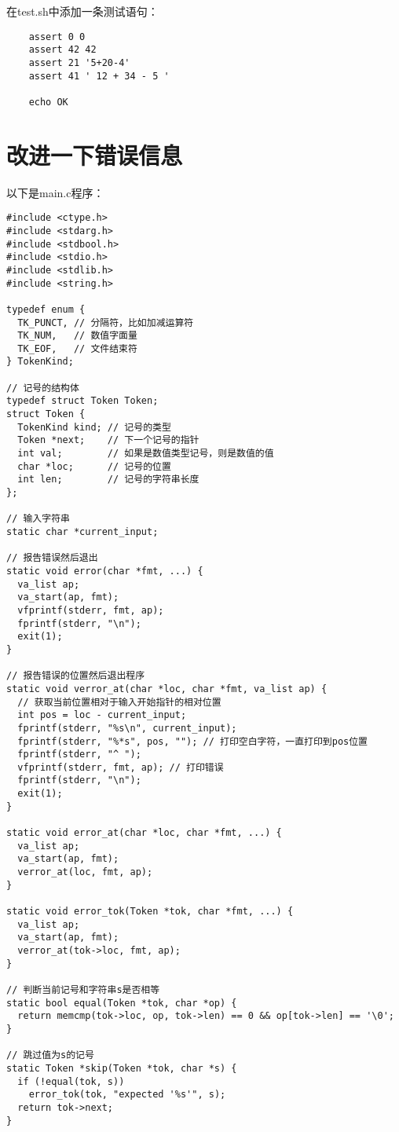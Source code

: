 \documentclass[cn,10pt,math=newtx,citestyle=gb7714-2015,bibstyle=gb7714-2015]{elegantbook}
\begin{document}
在test.sh中添加一条测试语句：

\begin{verbatim}
    assert 0 0
    assert 42 42
    assert 21 '5+20-4'
    assert 41 ' 12 + 34 - 5 '

    echo OK
\end{verbatim}

\chapter{改进一下错误信息}

以下是main.c程序：

\begin{verbatim}
#include <ctype.h>
#include <stdarg.h>
#include <stdbool.h>
#include <stdio.h>
#include <stdlib.h>
#include <string.h>

typedef enum {
  TK_PUNCT, // 分隔符，比如加减运算符
  TK_NUM,   // 数值字面量
  TK_EOF,   // 文件结束符
} TokenKind;

// 记号的结构体
typedef struct Token Token;
struct Token {
  TokenKind kind; // 记号的类型
  Token *next;    // 下一个记号的指针
  int val;        // 如果是数值类型记号，则是数值的值
  char *loc;      // 记号的位置
  int len;        // 记号的字符串长度
};

// 输入字符串
static char *current_input;

// 报告错误然后退出
static void error(char *fmt, ...) {
  va_list ap;
  va_start(ap, fmt);
  vfprintf(stderr, fmt, ap);
  fprintf(stderr, "\n");
  exit(1);
}

// 报告错误的位置然后退出程序
static void verror_at(char *loc, char *fmt, va_list ap) {
  // 获取当前位置相对于输入开始指针的相对位置
  int pos = loc - current_input;
  fprintf(stderr, "%s\n", current_input);
  fprintf(stderr, "%*s", pos, ""); // 打印空白字符，一直打印到pos位置
  fprintf(stderr, "^ ");
  vfprintf(stderr, fmt, ap); // 打印错误
  fprintf(stderr, "\n");
  exit(1);
}

static void error_at(char *loc, char *fmt, ...) {
  va_list ap;
  va_start(ap, fmt);
  verror_at(loc, fmt, ap);
}

static void error_tok(Token *tok, char *fmt, ...) {
  va_list ap;
  va_start(ap, fmt);
  verror_at(tok->loc, fmt, ap);
}

// 判断当前记号和字符串s是否相等
static bool equal(Token *tok, char *op) {
  return memcmp(tok->loc, op, tok->len) == 0 && op[tok->len] == '\0';
}

// 跳过值为s的记号
static Token *skip(Token *tok, char *s) {
  if (!equal(tok, s))
    error_tok(tok, "expected '%s'", s);
  return tok->next;
}


\end{verbatim}
\end{document}
